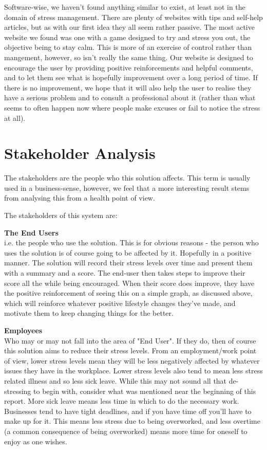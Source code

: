 \documentclass{scrartcl}
\begin{document}
Software-wise, we haven't found anything similar to exist, at least not in the domain of stress management. There are plenty of
websites with tips and self-help articles, but as with our first idea they all seem rather passive. The most active website we
found was one with a game designed to try and stress you out, the objective being to stay calm. This is more of an exercise of
control rather than mangement, however, so isn't really the same thing. Our website is designed to encourage the user by 
providing positive reinforcements and helpful comments, and to let them see what is hopefully improvement over a long period of time.
If there is no improvement, we hope that it will also help the user to realise they have a serious problem and to consult a
professional about it (rather than what seems to often happen now where people make excuses or fail to notice the stress at all).

\section{Stakeholder Analysis}
The stakeholders are the people who this solution affects. This term is usually used in a business-sense, however, we feel that
a more interesting result stems from analysing this from a health point of view.

The stakeholders of this system are:

\textbf{The End Users}\\
i.e. the people who use the solution. This is for obvious reasons - the person who uses the solution is of course going to be
affected by it. Hopefully in a positive manner. The solution will record their stress levels over time and present them with
a summary and a score. The end-user then takes steps to improve their score all the while being encouraged. When their score
does improve, they have the positive reinforcement of seeing this on a simple graph, as discussed above, which will reinforce
whatever positive lifestyle changes they've made, and motivate them to keep changing things for the better.

\textbf{Employees}\\
Who may or may not fall into the area of "End User". If they do, then of course this solution aims to reduce their stress levels.
From an employment/work point of view, lower stress levels mean they will be less negatively affected by whatever issues they
have in the workplace. Lower stress levels also tend to mean less stress related illness and so less sick leave. While this may
not sound all that de-stressing to begin with, consider what was mentioned near the beginning of this report. More sick leave
means less time in which to do the necessary work. Businesses tend to have tight deadlines, and if you have time off you'll have
to make up for it. This means less stress due to being overworked, and less overtime (a common consequence of being overworked)
means more time for oneself to enjoy as one wishes.
\end{document}
